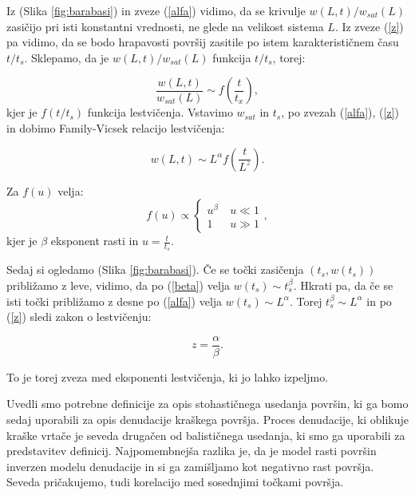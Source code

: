 \documentclass[a4paper, twoside, 12pt]{book}
\begin{document}
Iz (Slika \ref{fig:barabasi}) in zveze (\ref{alfa}) vidimo, da se krivulje $w(L,t)/w_{sat}(L)$ zasičijo pri isti konstantni vrednosti, ne glede na velikost sistema $L$. Iz zveze (\ref{z}) pa vidimo, da se bodo hrapavosti površij zasitile po istem karakterističnem času $t/t_s$. Sklepamo, da je $w(L,t)/w_{sat}(L)$ funkcija $t/t_s$, torej:

  \begin{equation}
    \frac{w(L,t)}{w_{sat}(L)} \sim f(\frac{t}{t_x}),
  \end{equation}
kjer je $f(t/t_s)$ funkcija lestvičenja. Vstavimo $w_{sat}$ in $t_s$, po zvezah (\ref{alfa}), (\ref{z}) in dobimo Family-Vicsek relacijo lestvičenja:

  \begin{equation}
    w(L,t) \sim L^\alpha f(\frac{t}{L^z}).
    \label{family-vicsek}
  \end{equation}

Za $f(u)$ velja:
  \begin{equation}
    f(u) \propto \left \{ \begin{array}{lr} u^{\beta} & \ u\ll 1 \\
      1 & \ u\gg1\end{array}, \right.
    \end{equation}
kjer je $\beta$ eksponent rasti in $u=\frac{t}{t_s}$.

Sedaj si ogledamo (Slika \ref{fig:barabasi}). Če se točki zasičenja $(t_s,w(t_s))$ približamo z leve, vidimo, da po (\ref{beta}) velja $w(t_s) \sim t_s^\beta$. Hkrati pa, da če se isti točki približamo z desne po (\ref{alfa}) velja $w(t_s) \sim L^\alpha$. Torej $t_s^\beta \sim L^\alpha$ in po (\ref{z}) sledi zakon o lestvičenju:

    \begin{equation}
      z = \frac{\alpha}{\beta}.
    \end{equation}

To je torej zveza med eksponenti lestvičenja, ki jo lahko izpeljmo.

Uvedli smo potrebne definicije za opis stohastičnega usedanja površin, ki ga bomo sedaj uporabili za opis denudacije kraškega površja. Proces denudacije, ki oblikuje kraške vrtače je seveda drugačen od balističnega usedanja, ki smo ga uporabili za predstavitev definicij. Najpomembnejša razlika je, da je model rasti površin inverzen modelu denudacije in si ga zamišljamo kot negativno rast površja. Seveda pričakujemo, tudi korelacijo med sosednjimi točkami površja.
\end{document}

